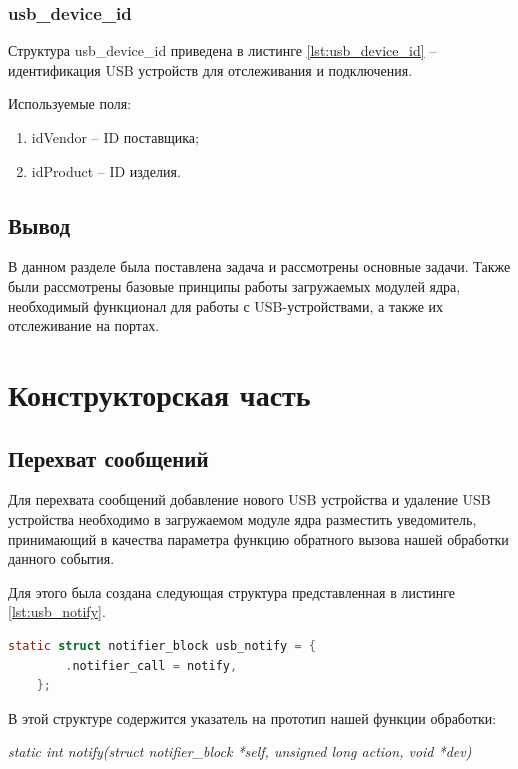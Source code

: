 \documentclass[a4paper, 10pt]{article}
\begin{document}
	\subsubsection{usb\_device\_id}
	\hspace*{5mm}Структура usb\_device\_id приведена в листинге \ref{lst:usb_device_id} -- идентификация USB устройств для отслеживания и подключения.
	
	\hspace*{-5mm}Используемые поля:
	\begin{enumerate}
		\item idVendor -- ID поставщика; 
		\item idProduct -- ID изделия.
	\end{enumerate}

	\subsection{Вывод}
	\hspace*{5mm} В данном разделе была поставлена задача и рассмотрены основные задачи. Также были рассмотрены базовые принципы работы загружаемых модулей ядра, необходимый функционал для работы с USB-устройствами, а также их отслеживание на портах.
\clearpage
\newpage
\section{Конструкторская часть}
	\subsection{Перехват сообщений}
	\hspace*{5mm}Для перехвата сообщений добавление нового USB устройства и удаление USB устройства необходимо в загружаемом модуле ядра разместить уведомитель, принимающий в качества параметра функцию обратного вызова нашей обработки данного события.
	
	Для этого была создана следующая структура представленная в листинге \ref{lst:usb_notify}.
	
	\begin{lstlisting}[language=C, caption = Структура usb\_notify, label=lst:usb_notify]
	static struct notifier_block usb_notify = {
		.notifier_call = notify,
	};
	\end{lstlisting}
	
	В этой структуре содержится указатель на прототип нашей функции обработки:
	
	\hspace*{5mm}\textit{static int notify(struct notifier\_block *self, unsigned long action, void *dev)}
	
\end{document}
